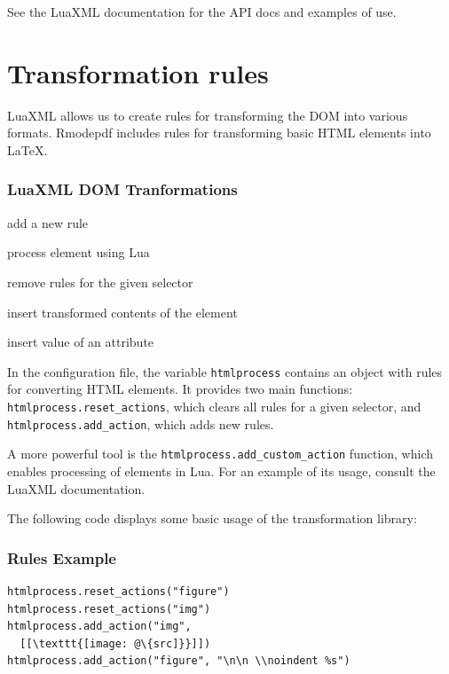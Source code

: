 See the LuaXML documentation for the API docs and examples of use.


\section{Transformation rules}


LuaXML allows us to create rules for transforming the DOM into various formats.
Rmodepdf includes rules for transforming basic HTML elements into \LaTeX.


\begin{frame}[fragile]

\frametitle{LuaXML DOM Tranformations}
\begin{description}
  \item[\texttt{htmlprocess.add\_action}] add a new rule
  \item[\texttt{htmlprocess.add\_custom\_action}] process element using Lua
  \item[\texttt{htmlprocess.reset\_actions}] remove rules for the given selector
  \item[\texttt{\%s}] insert transformed contents of the element
  \item[\texttt{@\{<attribute name>\}}] insert value of an attribute
\end{description}
\end{frame}

In the configuration file, the variable \texttt{htmlprocess} contains an object with
rules for converting HTML elements. It provides two main functions:
\texttt{htmlprocess.reset\_actions}, which clears all rules for a given selector, and
\texttt{htmlprocess.add\_action}, which adds new rules.

A more powerful tool is the \verb|htmlprocess.add_custom_action| function, which
enables processing of elements in Lua. For an example of its usage, consult the
LuaXML documentation.

The following code displays some basic usage of the transformation library:

\begin{frame}[fragile]
  \frametitle{Rules Example}

\begin{verbatim}
htmlprocess.reset_actions("figure")
htmlprocess.reset_actions("img")
htmlprocess.add_action("img",
  [[\texttt{[image: @\{src]}}]])
htmlprocess.add_action("figure", "\n\n \\noindent %s")
\end{verbatim}
\end{frame}


